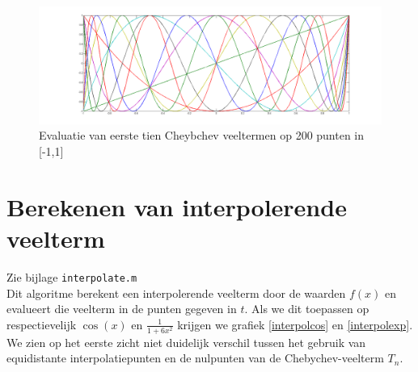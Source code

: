 \documentclass[a4paper, 12pt, titlepage]{report}
\begin{document}
\begin{figure}[htb]
	\includegraphics[width=\textwidth]{chebychev.png}
	\caption{Evaluatie van eerste tien Cheybchev veeltermen op 200 punten in [-1,1]}
	\label{chebychev}
\end{figure}

\section{Berekenen van interpolerende veelterm}
Zie bijlage \texttt{interpolate.m}\\
Dit algoritme berekent een interpolerende veelterm door de waarden $f(x)$ en evalueert die veelterm in de punten gegeven in $t$. Als we dit toepassen op respectievelijk $\cos(x)$ en $\frac{1}{1+6x^2}$ krijgen we grafiek \ref{interpolcos} en \ref{interpolexp}. We zien op het eerste zicht niet duidelijk verschil tussen het gebruik van equidistante interpolatiepunten en de nulpunten van de Chebychev-veelterm $T_n$.\\
\end{document}
